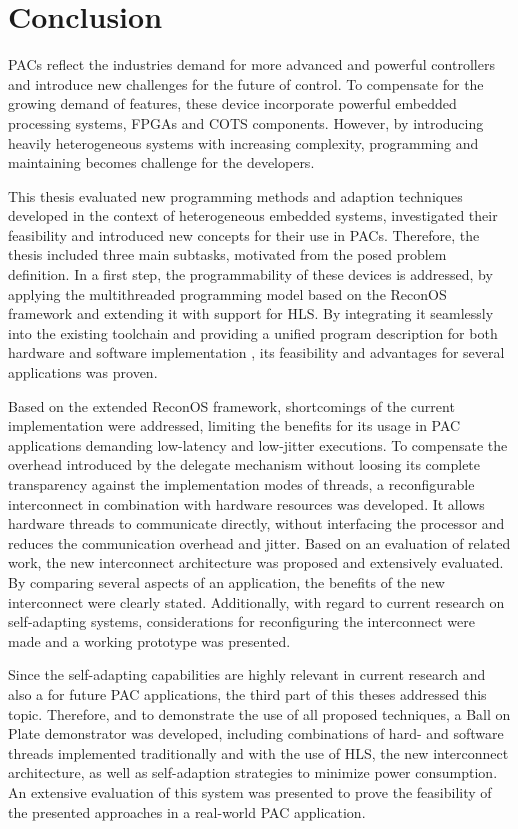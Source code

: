\chapter{Conclusion}
\label{sec:conclusion}
\aclp{PAC} reflect the industries demand for more advanced and powerful
controllers and introduce new challenges for the future of control. To
compensate for the growing demand of features, these device incorporate
powerful embedded processing systems, \acp{FPGA} and \ac{COTS} components.
However, by introducing heavily heterogeneous systems with increasing
complexity, programming and maintaining becomes challenge for the developers.

This thesis evaluated new programming methods and adaption
techniques developed in the context of heterogeneous embedded systems,
investigated their feasibility and introduced new concepts for their use in
\acp{PAC}. Therefore, the thesis included three main subtasks, motivated from
the posed problem definition. In a first step, the programmability of these
devices is addressed, by applying the multithreaded programming model based on
the ReconOS framework and extending it with support for \ac{HLS}. By
integrating it seamlessly into the existing toolchain and providing a unified
program description for both hardware and software implementation , its
feasibility and advantages for several applications was proven.

Based on the extended ReconOS framework, shortcomings of the current
implementation were addressed, limiting the benefits for its usage in
\ac{PAC} applications demanding low-latency and low-jitter executions. To
compensate the overhead introduced by the delegate mechanism without loosing
its complete transparency against the implementation modes of threads, a
reconfigurable interconnect in combination with hardware resources was
developed. It allows hardware threads to communicate directly, without
interfacing the processor and reduces the communication overhead and jitter.
Based on an evaluation of related work, the new interconnect architecture was
proposed and extensively evaluated. By comparing several aspects of an
application, the benefits of the new interconnect were clearly stated.
Additionally, with regard to current research on self-adapting systems,
considerations for reconfiguring the interconnect were made and a working
prototype was presented.

Since the self-adapting capabilities are highly relevant in current research
and also a for future \ac{PAC} applications, the third part of this theses
addressed this topic. Therefore, and to demonstrate the use of all proposed
techniques, a Ball on Plate demonstrator was developed, including combinations
of hard- and software threads implemented traditionally and with the use of
\ac{HLS}, the new interconnect architecture, as well as self-adaption
strategies to minimize power consumption. An extensive evaluation of this
system was presented to prove the feasibility of the presented approaches in a
real-world \ac{PAC} application.

